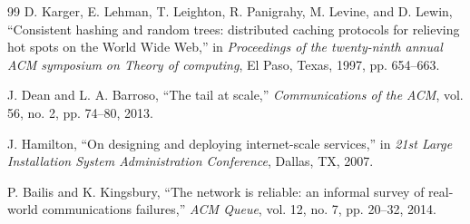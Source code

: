\begin{thebibliography}{99}
D. Karger, E. Lehman, T. Leighton, R. Panigrahy, M. Levine, and D. Lewin, ``Consistent hashing and random trees: distributed caching protocols for relieving hot spots on the World Wide Web,'' in \textit{Proceedings of the twenty-ninth annual ACM symposium on Theory of computing}, El Paso, Texas, 1997, pp. 654--663.

J. Dean and L. A. Barroso, ``The tail at scale,'' \textit{Communications of the ACM}, vol. 56, no. 2, pp. 74--80, 2013.

J. Hamilton, ``On designing and deploying internet-scale services,'' in \textit{21st Large Installation System Administration Conference}, Dallas, TX, 2007.

P. Bailis and K. Kingsbury, ``The network is reliable: an informal survey of real-world communications failures,'' \textit{ACM Queue}, vol. 12, no. 7, pp. 20--32, 2014.

\end{thebibliography}
